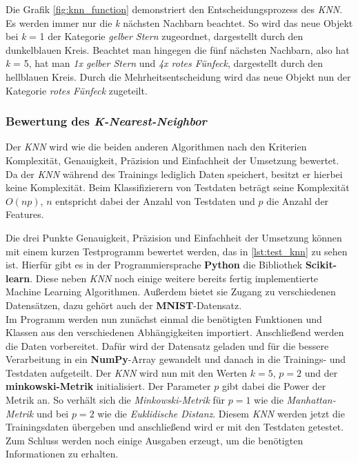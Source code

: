 Die Grafik \ref{fig:knn_function} demonstriert den Entscheidungsprozess des \textit{KNN}. Es werden immer nur die \textit{k} nächsten Nachbarn beachtet. So wird das neue Objekt bei \textit{k} = 1 der Kategorie \textit{gelber Stern} zugeordnet, dargestellt durch den dunkelblauen Kreis. Beachtet man hingegen die fünf nächsten Nachbarn, also hat \textit{k} = 5, hat man \textit{1x gelber Stern} und \textit{4x rotes Fünfeck}, dargestellt durch den hellblauen Kreis. Durch die Mehrheitsentscheidung wird das neue Objekt nun der Kategorie \textit{rotes Fünfeck} zugeteilt.

\subsubsection{Bewertung des \textit{K-Nearest-Neighbor}}
Der \textit{KNN} wird wie die beiden anderen Algorithmen nach den Kriterien Komplexität, Genauigkeit, Präzision und Einfachheit der Umsetzung bewertet.\\\hfill
Da der \textit{KNN} während des Trainings lediglich Daten speichert, besitzt er hierbei keine Komplexität. Beim Klassifizierern von Testdaten beträgt seine Komplexität $O(np)$, $n$ entspricht dabei der Anzahl von Testdaten und $p$ die Anzahl der Features.\cite{complexity} \par
Die drei Punkte Genauigkeit, Präzision und Einfachheit der Umsetzung können mit einem kurzen Testprogramm bewertet werden, das in \ref{lst:test_knn} zu sehen ist. Hierfür gibt es in der Programmiersprache \textbf{Python} die Bibliothek \textbf{Scikit-learn}. Diese neben \textit{KNN} noch einige weitere bereits fertig implementierte Machine Learning Algorithmen. Außerdem bietet sie Zugang zu verschiedenen Datensätzen, dazu gehört auch der \textbf{MNIST}-Datensatz. \\\hfill
Im Programm werden nun zunächst einmal die benötigten Funktionen und Klassen aus den verschiedenen Abhängigkeiten importiert. Anschließend werden die Daten vorbereitet. Dafür wird der Datensatz geladen und für die bessere Verarbeitung in ein \textbf{NumPy}-Array gewandelt und danach in die Trainings- und Testdaten aufgeteilt. Der \textit{KNN} wird nun mit den Werten $k = 5$, $p = 2$ und der \textbf{minkowski-Metrik} initialisiert. Der Parameter $p$ gibt dabei die Power der Metrik an. So verhält sich die \textit{Minkowski-Metrik} für $p = 1$ wie die \textit{Manhattan-Metrik} und bei $p = 2$ wie die \textit{Euklidische Distanz}. Diesem \textit{KNN} werden jetzt die Trainingsdaten übergeben und anschließend wird er mit den Testdaten getestet. Zum Schluss werden noch einige Ausgaben erzeugt, um die benötigten Informationen zu erhalten.\\\hfill

